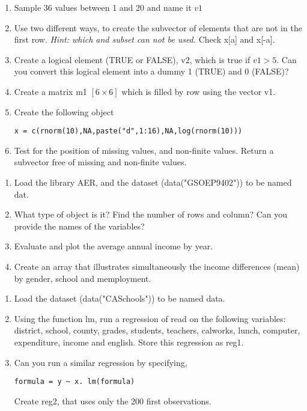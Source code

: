 \documentclass[11pt,a4paper]{article}
\newcommand{\1}{\mathbb{1}}
\begin{document}
\begin{Exercise}[title= Indexes]
\begin{enumerate}
\item Sample 36 values between 1 and 20 and name it $v1$ 
\item Use two different ways, to create the subvector of elements that are not in the first row. \emph{Hint: which and subset can not be used.} Check x[a] and x[-a]. 
\item Create a logical element (TRUE or FALSE), v2, which is true if $v1>5$. Can you convert this logical element into a dummy 1 (TRUE) and 0 (FALSE)?
\item Create a matrix m1 $[6\times 6]$ which is filled by row using the vector v1. 
\item Create the following object 
\begin{verbatim}
x = c(rnorm(10),NA,paste("d",1:16),NA,log(rnorm(10)))
 \end{verbatim}
\item Test for the position of missing values, and non-finite values.
Return a subvector free of missing and non-finite values. 
\end{enumerate}
\end{Exercise}


\begin{Exercise}[title=Data Manipulation]
\begin{enumerate}
\item Load the library AER, and the dataset (data("GSOEP9402")) to be named dat. 
\item What type of object is it? Find the number of rows and column? Can you provide the names of the variables?
\item Evaluate and plot the average annual income by year. 
\item Create an array that illustrates simultaneously the income differences (mean) by gender, school and memployment. 
\end{enumerate}
\end{Exercise}

\begin{Exercise}[title=First regression]
\begin{enumerate}
\item Load the dataset (data("CASchools")) to be named data.
\item Using the function lm, run a regression of read on the following variables: district, school, county, grades, students, teachers, calworks, lunch, computer, expenditure, income and english. Store this regression as reg1. 
\item Can you run a similar regression by specifying, \begin{verbatim}
formula = y ~ x. lm(formula)
\end{verbatim} Create reg2, that uses only the 200 first observations.  
\end{enumerate}
\end{Exercise}
\end{document}
